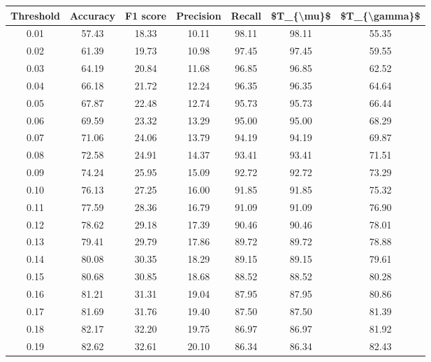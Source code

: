 \begin{tabular}{|c|c|c|c|c|c|c|}
\hline
 Threshold &  Accuracy &  F1 score &  Precision &  Recall &  \$T\_\{\textbackslash mu\}\$ &  \$T\_\{\textbackslash gamma\}\$ \\
\hline
      0.01 &     57.43 &     18.33 &      10.11 &   98.11 &      98.11 &         55.35 \\
      0.02 &     61.39 &     19.73 &      10.98 &   97.45 &      97.45 &         59.55 \\
      0.03 &     64.19 &     20.84 &      11.68 &   96.85 &      96.85 &         62.52 \\
      0.04 &     66.18 &     21.72 &      12.24 &   96.35 &      96.35 &         64.64 \\
      0.05 &     67.87 &     22.48 &      12.74 &   95.73 &      95.73 &         66.44 \\
      0.06 &     69.59 &     23.32 &      13.29 &   95.00 &      95.00 &         68.29 \\
      0.07 &     71.06 &     24.06 &      13.79 &   94.19 &      94.19 &         69.87 \\
      0.08 &     72.58 &     24.91 &      14.37 &   93.41 &      93.41 &         71.51 \\
      0.09 &     74.24 &     25.95 &      15.09 &   92.72 &      92.72 &         73.29 \\
      0.10 &     76.13 &     27.25 &      16.00 &   91.85 &      91.85 &         75.32 \\
      0.11 &     77.59 &     28.36 &      16.79 &   91.09 &      91.09 &         76.90 \\
      0.12 &     78.62 &     29.18 &      17.39 &   90.46 &      90.46 &         78.01 \\
      0.13 &     79.41 &     29.79 &      17.86 &   89.72 &      89.72 &         78.88 \\
      0.14 &     80.08 &     30.35 &      18.29 &   89.15 &      89.15 &         79.61 \\
      0.15 &     80.68 &     30.85 &      18.68 &   88.52 &      88.52 &         80.28 \\
      0.16 &     81.21 &     31.31 &      19.04 &   87.95 &      87.95 &         80.86 \\
      0.17 &     81.69 &     31.76 &      19.40 &   87.50 &      87.50 &         81.39 \\
      0.18 &     82.17 &     32.20 &      19.75 &   86.97 &      86.97 &         81.92 \\
      0.19 &     82.62 &     32.61 &      20.10 &   86.34 &      86.34 &         82.43 \\

\end{tabular}
